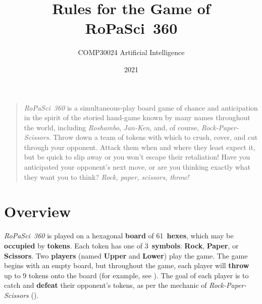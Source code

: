 \documentclass[]{article}
\title{
    {\LARGE Rules for the Game of}
    \\[1ex]
    {\Huge\bf RoPaSci~360}
}
\author{
    COMP30024 Artificial Intelligence
}
\date{2021}
\begin{document}
\maketitle

\begin{quote}
    \emph{RoPaSci~360} is a simultaneous-play board game of chance and
    anticipation in the spirit of the storied hand-game known by many
    names throughout the world, including \emph{Roshambo}, \emph{Jan-Ken},
    and, of course, \emph{Rock-Paper-Scissors}.
    Throw down a team of tokens with which to crush, cover, and cut
    through your opponent.
    Attack them when and where they least expect it, but be quick to
    slip away or you won't escape their retaliation!
    Have you anticipated your opponent's next move,
    or are you thinking exactly what they want you to think?
    \emph{Rock, paper, scissors, throw!}
\end{quote}

\section*{Overview}

\emph{RoPaSci~360} is played on a hexagonal \textbf{board} of
61~\textbf{hexes}, which may be \textbf{occupied} by \textbf{tokens}.
%
Each token has one of 3~\textbf{symbols}: \textbf{Rock}, \textbf{Paper}, or
\textbf{Scissors}.
%
Two \textbf{players} (named \textbf{Upper} and \textbf{Lower}) play the game.
%
The game begins with an empty board, but throughout the game, each player
will \textbf{throw} up to 9 tokens onto the board
(for example, see ).
%
The goal of each player is to catch and \textbf{defeat} their opponent's
tokens, as per the mechanic of \emph{Rock-Paper-Scissors} ().
\end{document}
